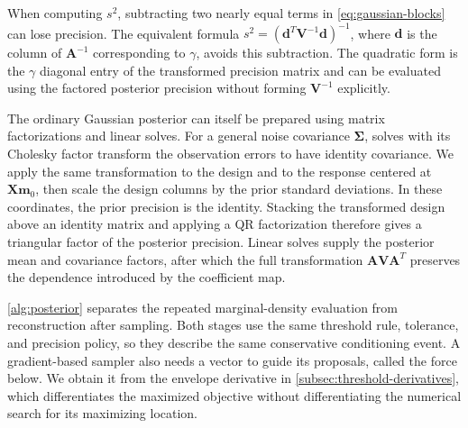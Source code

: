 When computing $s^2$, subtracting two nearly equal terms in
\cref{eq:gaussian-blocks} can lose precision. The equivalent formula
$s^2=(\boldsymbol d^T\boldsymbol V^{-1}\boldsymbol d)^{-1}$,
where $\boldsymbol d$ is the column of $\boldsymbol A^{-1}$
corresponding to $\gamma$, avoids this subtraction.
The quadratic form is the $\gamma$ diagonal entry of the transformed
precision matrix and can be evaluated using the factored posterior
precision without forming $\boldsymbol V^{-1}$ explicitly.

The ordinary Gaussian posterior can itself be prepared using matrix
factorizations and linear solves. For a general noise covariance
$\boldsymbol\Sigma$, solves with its Cholesky factor transform the
observation errors to have identity covariance. We apply the same transformation
to the design and to the response centered at
$\boldsymbol X\boldsymbol m_0$, then scale the design columns by
the prior standard deviations. In these coordinates, the prior
precision is the identity. Stacking the transformed design above an
identity matrix and applying a QR factorization therefore gives a
triangular factor of the posterior precision. Linear solves supply
the posterior mean and covariance factors, after which the full
transformation $\boldsymbol A\boldsymbol V\boldsymbol A^T$
preserves the dependence introduced by the coefficient map.

\cref{alg:posterior} separates the repeated marginal-density
evaluation from reconstruction after sampling. Both stages use the
same threshold rule, tolerance, and precision policy, so they describe
the same conservative conditioning event. A gradient-based sampler
also needs a vector to guide its proposals, called the force below.
We obtain it from the envelope derivative in
\cref{subsec:threshold-derivatives}, which differentiates the
maximized objective without differentiating the numerical search
for its maximizing location.

